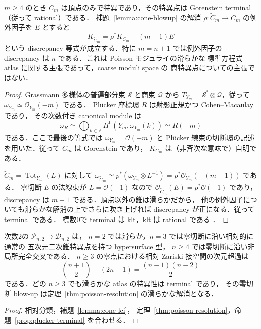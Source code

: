 \begin{proposition}
\label{prop:plucker-terminal}
$m\geq4$ のとき $C_m$ は頂点のみで特異であり，その特異点は
Gorenstein terminal（従って rational）である．
補題~\ref{lemma:cone-blowup} の解消 $\rho:\widetilde C_m\to C_m$ の例外因子を
$E$ とすると
\[
 K_{\widetilde C_m}=\rho^*K_{C_m}+(m-1)E
\]
という discrepancy 等式が成立する．特に $m=n+1$ では例外因子の
discrepancy は $n$ である．これは Poisson モジュライの滑らかな
標準方程式 atlas に関する主張であって，coarse moduli space の
商特異点についての主張ではない．
\end{proposition}
\begin{proof}
Grassmann 多様体の普遍部分束 $\mathcal S$ と商束 $\mathcal Q$ から
$T_{Y_m}=\mathcal S^*\otimes\mathcal Q$，従って
$\omega_{Y_m}\simeq\mathcal O_{Y_m}(-m)$ である．
Pl\"ucker 座標環 $R$ は射影正規かつ Cohen--Macaulay であり，
その次数付き canonical module は
\[
 \omega_R\simeq
 \bigoplus_{k\in\mathbb Z}H^0(Y_m,\omega_{Y_m}(k))
 \simeq R(-m)
\]
である．ここで最後の等式では $\omega_{Y_m}=\mathcal O(-m)$ と
Pl\"ucker 線束の切断環の記述を用いた．従って $C_m$ は Gorenstein であり，
$K_{C_m}$ は（非斉次な意味で）自明である．

$\widetilde C_m=\operatorname{Tot}_{Y_m}(L)$ に対して
$\omega_{\widetilde C_m}\simeq
p^*(\omega_{Y_m}\otimes L^{-1})=p^*\mathcal O_{Y_m}(-(m-1))$ である．
零切断 $E$ の法線束が $L=\mathcal O(-1)$ なので
$\mathcal O_{\widetilde C_m}(E)=p^*\mathcal O(-1)$ であり，
discrepancy は $m-1$ である．頂点以外の錐は滑らかだから，
他の例外因子についても滑らかな解消の上でさらに吹き上げれば
discrepancy が正になる．従って terminal である．
標数0で terminal は klt，klt は rational である
\cite[Chapter 5]{KollarMori1998}．
\end{proof}

\begin{corollary}[相対モジュライの特異性の次元別分類]
\label{cor:moduli-singularity-types}
次数2の $\mathcal P_{n,2}\to\mathcal D_{n,2}$ は，
$n=2$ では滑らか，$n=3$ では零切断に沿い相対的に通常の
五次元二次錐特異点を持つ hypersurface 型，
$n\geq4$ では零切断に沿い非局所完全交叉である．
$n\geq3$ の零点における相対 Zariski 接空間の次元超過は
\[
 \binom{n+1}{2}-(2n-1)=\frac{(n-1)(n-2)}2
\]
である．どの $n\geq3$ でも滑らかな atlas の特異性は terminal であり，
その零切断 blow-up は定理~\ref{thm:poisson-resolution} の滑らかな解消となる．
\end{corollary}
\begin{proof}
相対分類，補題~\ref{lemma:cone-lci}，
定理~\ref{thm:poisson-resolution}，命題~\ref{prop:plucker-terminal} を合わせる．
\end{proof}

